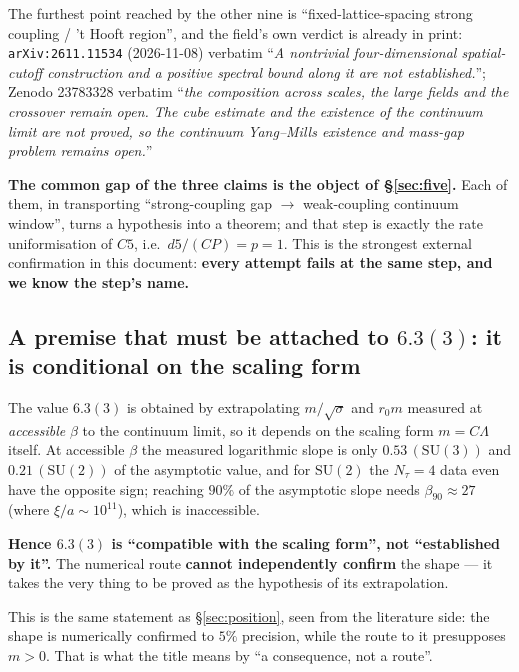 \noindent
The furthest point reached by the other nine is ``fixed-lattice-spacing strong coupling / 't Hooft
region'', and the field's own verdict is already in print: \texttt{arXiv:2611.11534} (2026-11-08)
verbatim ``\emph{A nontrivial four-dimensional spatial-cutoff construction and a positive spectral
bound along it are not established.}''; Zenodo 23783328 verbatim ``\emph{the composition across
scales, the large fields and the crossover remain open. The cube estimate and the existence of the
continuum limit are not proved, so the continuum Yang--Mills existence and mass-gap problem remains
open.}'' \LT
{}

\begin{keybox}
\textbf{The common gap of the three claims is the object of \S\ref{sec:five}.} Each of them, in
transporting ``strong-coupling gap $\to$ weak-coupling continuum window'', turns a hypothesis into a
theorem; and that step is exactly the rate uniformisation of $C5$, i.e.\ $d5/(CP)=p=1$. This is the
strongest external confirmation in this document: \textbf{every attempt fails at the same step, and we
know the step's name.} \LT
\end{keybox}

\subsection{A premise that must be attached to $6.3(3)$: it is conditional on the scaling form}

The value $6.3(3)$ is obtained by extrapolating $m/\sqrt{\sigma}$ and $r_0m$ measured at
\emph{accessible} $\beta$ to the continuum limit, so it depends on the scaling form $m=C\Lambda$ itself.
At accessible $\beta$ the measured logarithmic slope is only $0.53\,(\mathrm{SU}(3))$ and
$0.21\,(\mathrm{SU}(2))$ of the asymptotic value, and for $\mathrm{SU}(2)$ the $N_\tau=4$ data even
have the opposite sign; reaching $90\%$ of the asymptotic slope needs $\beta_{90}\approx27$ (where
$\xi/a\sim10^{11}$), which is inaccessible. \LE
{}

\begin{keybox}
\textbf{Hence $6.3(3)$ is ``compatible with the scaling form'', not ``established by it''.} The
numerical route \textbf{cannot independently confirm} the shape --- it takes the very thing to be proved
as the hypothesis of its extrapolation. \LN
\end{keybox}

\noindent
This is the same statement as \S\ref{sec:position}, seen from the literature side: the shape is
numerically confirmed to $5\%$ precision, while the route to it presupposes $m>0$. That is what the
title means by ``a consequence, not a route''.

